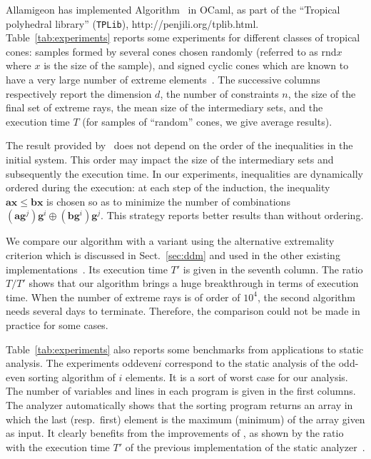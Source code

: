 \documentclass[proceedings]{stacs}
\newcommand{\href}[2]{#2}
\newcommand{\mpplus}{\oplus}
\newcommand{\vect}[1]{\boldsymbol #1}
\newcommand{\ComputeExtremal}{\Call{ComputeExtreme}{}}
\begin{document}
Allamigeon has implemented Algorithm~\ComputeExtremal{} in OCaml,
as part of the ``Tropical polyhedral library'' ({\tt TPLib}), \href{http://penjili.org/tplib.html}{http://penjili.org/tplib.html}. Table~\ref{tab:experiments} reports some experiments for different classes of tropical cones: samples formed by several cones chosen randomly (referred to as rnd$x$ where $x$ is the size of the sample), and signed cyclic cones which are known to have a very large number of extreme elements~\cite{AGK09}. 
The successive columns respectively report the dimension $d$, the number of constraints $n$, the size of the final set of extreme rays, the mean size of the intermediary sets, and the execution time $T$ (for samples of ``random'' cones, we give average results). 

The result provided by~\ComputeExtremal{} does not depend on the order of the inequalities in the initial system. This order may impact the size of the intermediary sets and subsequently the execution time. In our experiments, inequalities are dynamically ordered during the execution: at each step of the induction, the inequality $\vect{a} \vect{x} \leq \vect{b} \vect{x}$ is chosen so as to minimize the number of combinations $(\vect{a}\vect{g}^j)\vect{g}^i \mpplus (\vect{b} \vect{g}^i) \vect{g}^j$. 
This strategy reports better results than without ordering.


We compare our algorithm with a variant using the alternative extremality criterion which is discussed in Sect.~\ref{sec:ddm} and used in the other existing implementations~\cite{toolbox,AGG08}. Its execution time $T'$ is given in the seventh column. The ratio $T/T'$ shows that our algorithm brings a huge breakthrough in terms of execution time. When the number of extreme rays is of order of $10^4$, the second algorithm needs several days to terminate. Therefore, the comparison could not be made in practice for some cases.

Table~\ref{tab:experiments} also reports some benchmarks from applications to static analysis. The experiments oddeven$i$ correspond to the static analysis of the odd-even sorting algorithm of $i$ elements. It is a sort of worst case for our analysis. The number of variables and lines in each program is given in the first columns. The analyzer automatically shows that the sorting program returns an array in which the last (resp.\ first) element is the maximum (minimum) of the array given as input. It clearly benefits from the improvements of , as shown by the ratio with the execution time $T'$ of the previous implementation of the static analyzer~\cite{AGG08}.


\end{document}
